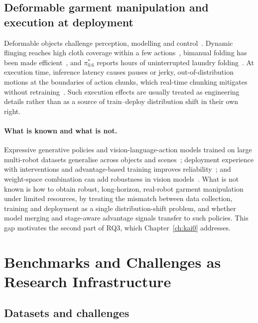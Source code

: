 \subsection{Deformable garment manipulation and execution at deployment}

Deformable objects challenge perception, modelling and control~\cite{sanchez2018survey}. Dynamic flinging reaches high cloth coverage within a few actions~\cite{ha2021flingbot}, bimanual folding has been made efficient~\cite{avigal2022speedfolding}, and $\pi^{*}_{0.6}$ reports hours of uninterrupted laundry folding~\cite{amin2026pistar06}. At execution time, inference latency causes pauses or jerky, out-of-distribution motions at the boundaries of action chunks, which real-time chunking mitigates without retraining~\cite{black2025rtc}. Such execution effects are usually treated as engineering details rather than as a source of train--deploy distribution shift in their own right.

\paragraph{What is known and what is not.} Expressive generative policies and vision-language-action models trained on large multi-robot datasets generalise across objects and scenes~\cite{chi2023diffusion,kim2024openvla,black2025pi05}; deployment experience with interventions and advantage-based training improves reliability~\cite{luo2025hilserl,amin2026pistar06}; and weight-space combination can add robustness in vision models~\cite{wortsman2022wiseft}. What is not known is how to obtain robust, long-horizon, real-robot garment manipulation under limited resources, by treating the mismatch between data collection, training and deployment as a single distribution-shift problem, and whether model merging and stage-aware advantage signals transfer to such policies. This gap motivates the second part of RQ3, which Chapter~\ref{ch:kai0} addresses.

\section{Benchmarks and Challenges as Research Infrastructure}\label{sec:bg:bench}

\subsection{Datasets and challenges}

